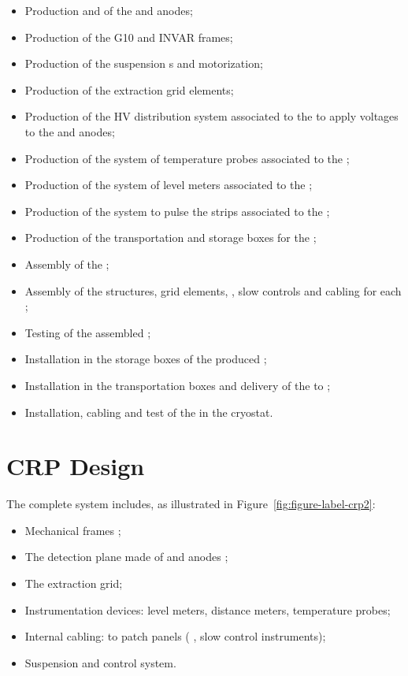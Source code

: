 \begin{itemize}
\item  Production and  of the  and anodes;
\item  Production of the G10 and INVAR frames;
\item Production of the suspension \fdth{}s and motorization;
\item Production of the extraction grid elements;
\item Production of the HV distribution system associated to the  to apply voltages to the  and anodes;
\item Production of the system of temperature probes associated to the ;
\item Production of the system of level meters associated to the ;
\item Production of the system to pulse the strips associated to the ;
\item Production of the transportation and storage boxes for the ;
\item Assembly of the ;
\item Assembly of the  structures,   grid elements, , slow controls and cabling for each ;
\item Testing of the assembled ;
\item Installation in the storage boxes of the produced ;
\item Installation in the transportation boxes and delivery of the  to \surf{}; %
\item Installation, cabling and test of the  in the cryostat.
\end{itemize}


\section{CRP Design}
\label{sec:fddp-crp-design}

The complete  system includes, as illustrated in Figure~\ref{fig:figure-label-crp2}:
\begin{itemize}
\item Mechanical frames  ;
\item The detection plane made of  and anodes ;
\item The extraction grid;
\item Instrumentation devices: level meters, distance meters, temperature probes;
\item Internal cabling: to patch panels ( , slow control instruments);
\item Suspension and control system.
\end{itemize}

